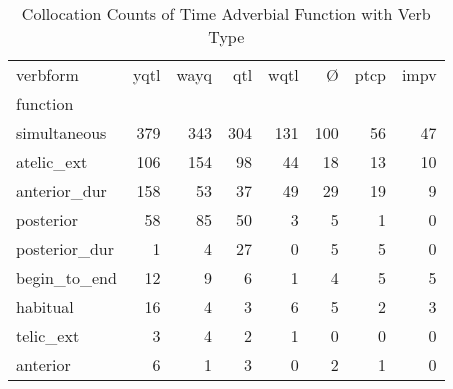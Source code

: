 \begin{table}[htbp!]
\centering
\caption{Collocation Counts of Time Adverbial Function with Verb Type}
\label{table:verbfunct_ct}
\begin{tabular}{lrrrrrrr}
\toprule
verbform &  yqtl &  wayq &  qtl &  wqtl &    Ø &  ptcp &  impv \\
function      &       &       &      &       &      &       &       \\
\midrule
simultaneous  &   379 &   343 &  304 &   131 &  100 &    56 &    47 \\
atelic\_ext    &   106 &   154 &   98 &    44 &   18 &    13 &    10 \\
anterior\_dur  &   158 &    53 &   37 &    49 &   29 &    19 &     9 \\
posterior     &    58 &    85 &   50 &     3 &    5 &     1 &     0 \\
posterior\_dur &     1 &     4 &   27 &     0 &    5 &     5 &     0 \\
begin\_to\_end  &    12 &     9 &    6 &     1 &    4 &     5 &     5 \\
habitual      &    16 &     4 &    3 &     6 &    5 &     2 &     3 \\
telic\_ext     &     3 &     4 &    2 &     1 &    0 &     0 &     0 \\
anterior      &     6 &     1 &    3 &     0 &    2 &     1 &     0 \\
\bottomrule
\end{tabular}
\end{table}
